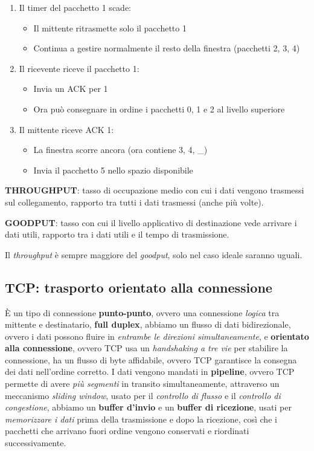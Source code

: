 \begin{enumerate}
\begin{enumerate}
       \item Il timer del pacchetto 1 scade:
           \begin{itemize}
               \item Il mittente ritrasmette solo il pacchetto 1
               \item Continua a gestire normalmente il resto della finestra (pacchetti 2, 3, 4)
           \end{itemize}
       \item Il ricevente riceve il pacchetto 1:
           \begin{itemize}
               \item Invia un ACK per 1
               \item Ora può consegnare in ordine i pacchetti 0, 1 e 2 al livello superiore
           \end{itemize}
       \item Il mittente riceve ACK 1:
           \begin{itemize}
               \item La finestra scorre ancora (ora contiene 3, 4, \_)
               \item Invia il pacchetto 5 nello spazio disponibile
           \end{itemize}
  \end{enumerate}
\end{enumerate}

\textbf{THROUGHPUT}: tasso di occupazione medio con cui i dati vengono trasmessi sul collegamento, rapporto tra tutti i dati trasmessi (anche più volte). \

\textbf{GOODPUT}: tasso con cui il livello applicativo di destinazione vede arrivare i dati utili, rapporto tra i dati utili e il tempo di trasmissione. \

Il \textit{throughput} è sempre maggiore del \textit{goodput}, solo nel caso ideale saranno uguali.

\subsection{TCP: trasporto orientato alla connessione}
È un tipo di connessione \textbf{punto-punto}, ovvero una connessione \textit{logica} tra mittente e destinatario, \textbf{full duplex}, abbiamo un flusso di dati bidirezionale, ovvero i dati possono fluire in \textit{entrambe le direzioni simultaneamente}, e \textbf{orientato alla connessione}, ovvero TCP usa un \textit{handshaking a tre vie} per stabilire la connessione, ha un flusso di byte affidabile, ovvero TCP garantisce la consegna dei dati nell'ordine corretto.
I dati vengono mandati in \textbf{pipeline}, ovvero TCP permette di avere \textit{più segmenti} in transito simultaneamente, attraverso un meccanismo \textit{sliding window}, usato per il \textit{controllo di flusso} e il \textit{controllo di congestione}, abbiamo un \textbf{buffer d'invio} e un \textbf{buffer di ricezione}, usati per \textit{memorizzare i dati} prima della trasmissione e dopo la ricezione, così che i pacchetti che arrivano fuori ordine vengono conservati e riordinati successivamente.

